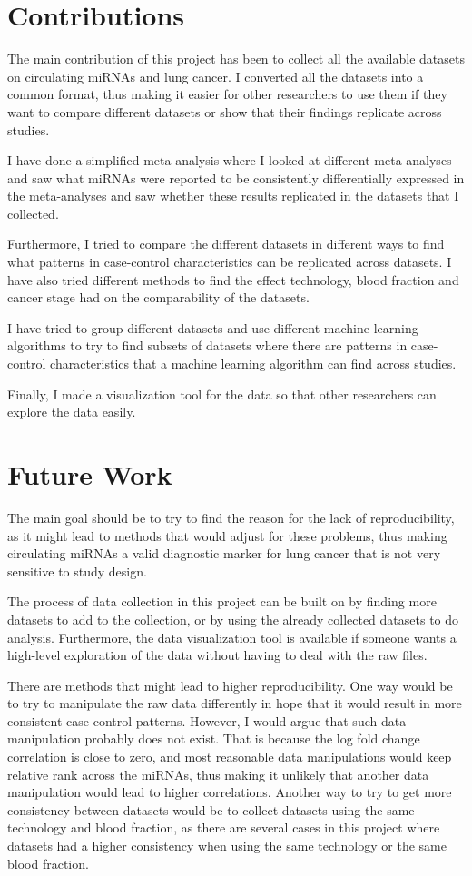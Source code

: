 \section{Contributions}
\label{sec:contributions}

The main contribution of this project has been to collect all the available datasets on circulating miRNAs and lung cancer. I converted all the datasets into a common format, thus making it easier for other researchers to use them if they want to compare different datasets or show that their findings replicate across studies.

I have done a simplified meta-analysis where I looked at different meta-analyses and saw what miRNAs were reported to be consistently differentially expressed in the meta-analyses and saw whether these results replicated in the datasets that I collected.

Furthermore, I tried to compare the different datasets in different ways to find what patterns in case-control characteristics can be replicated across datasets. I have also tried different methods to find the effect technology, blood fraction and cancer stage had on the comparability of the datasets.

I have tried to group different datasets and use different machine learning algorithms to try to find subsets of datasets where there are patterns in case-control characteristics that a machine learning algorithm can find across studies.

Finally, I made a visualization tool for the data so that other researchers can explore the data easily.

\section{Future Work}
\label{sec:future_work}
The main goal should be to try to find the reason for the lack of reproducibility, as it might lead to methods that would adjust for these problems, thus making circulating miRNAs a valid diagnostic marker for lung cancer that is not very sensitive to study design.

The process of data collection in this project can be built on by finding more datasets to add to the collection, or by using the already collected datasets to do analysis. Furthermore, the data visualization tool is available if someone wants a high-level exploration of the data without having to deal with the raw files.

There are methods that might lead to higher reproducibility. One way would be to try to manipulate the raw data differently in hope that it would result in more consistent case-control patterns. However, I would argue that such data manipulation probably does not exist. That is because the log fold change correlation is close to zero, and most reasonable data manipulations would keep relative rank across the miRNAs, thus making it unlikely that another data manipulation would lead to higher correlations. Another way to try to get more consistency between datasets would be to collect datasets using the same technology and blood fraction, as there are several cases in this project where datasets had a higher consistency when using the same technology or the same blood fraction.

